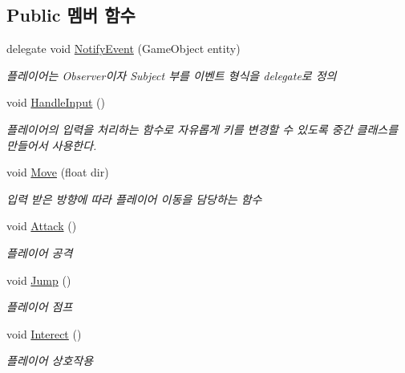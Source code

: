 \subsection*{Public 멤버 함수}
\begin{DoxyCompactItemize}
\item 
delegate void \mbox{\hyperlink{class_player_controller_a934c7f80b80276620cd60eaaeea7520e}{Notify\+Event}} (Game\+Object entity)
\begin{DoxyCompactList}\small\item\em 플레이어는 Observer이자 Subject 부를 이벤트 형식을 delegate로 정의 \end{DoxyCompactList}\item 
void \mbox{\hyperlink{class_player_controller_a5ebfe098b2dc258ca8349e6951766883}{Handle\+Input}} ()
\begin{DoxyCompactList}\small\item\em 플레이어의 입력을 처리하는 함수로 자유롭게 키를 변경할 수 있도록 중간 클래스를 만들어서 사용한다. \end{DoxyCompactList}\item 
void \mbox{\hyperlink{class_player_controller_a6e383e6fbce014f4a841143774a6a1e7}{Move}} (float dir)
\begin{DoxyCompactList}\small\item\em 입력 받은 방향에 따라 플레이어 이동을 담당하는 함수 \end{DoxyCompactList}\item 
void \mbox{\hyperlink{class_player_controller_a473a610cfe2a374d5cb39b3c44881d11}{Attack}} ()
\begin{DoxyCompactList}\small\item\em 플레이어 공격 \end{DoxyCompactList}\item 
void \mbox{\hyperlink{class_player_controller_a8a7010cb6f3c524737be3f6f77553df9}{Jump}} ()
\begin{DoxyCompactList}\small\item\em 플레이어 점프 \end{DoxyCompactList}\item 
void \mbox{\hyperlink{class_player_controller_a2af84a2de0a9c5b304d91cc674e76fc1}{Interect}} ()
\begin{DoxyCompactList}\small\item\em 플레이어 상호작용 \end{DoxyCompactList}\end{DoxyCompactItemize}
